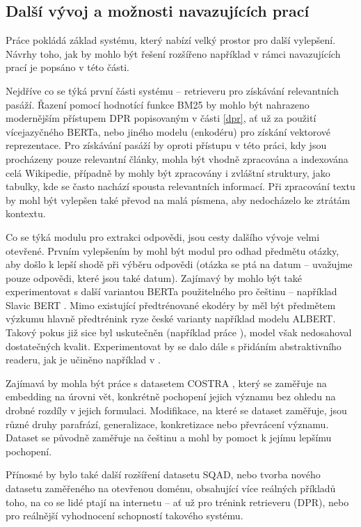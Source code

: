 \subsection{Další vývoj a možnosti navazujících prací}
Práce pokládá základ systému, který nabízí velký prostor pro další vylepšení. Návrhy toho, jak by mohlo být řešení rozšířeno například v rámci navazujících prací je popsáno v této části.\par
Nejdříve co se týká první části systému -- retrieveru pro získávání relevantních pasáží. Řazení pomocí hodnotící funkce BM25 by mohlo být nahrazeno modernějším přístupem DPR popisovaným v části \ref{dpr}, ať už za použití vícejazyčného BERTa, nebo jiného modelu (enkodéru) pro získání vektorové reprezentace. Pro získávání pasáží by oproti přístupu v této práci, kdy jsou procházeny pouze relevantní články, mohla být vhodně zpracována a indexována celá Wikipedie, případně by mohly být zpracovány i zvláštní struktury, jako tabulky, kde se často nachází spousta relevantních informací. Při zpracování textu by mohl být vylepšen také převod na malá písmena, aby nedocházelo ke ztrátám kontextu.\par
Co se týká modulu pro extrakci odpovědi, jsou cesty dalšího vývoje velmi otevřené. Prvním vylepšením by mohl být modul pro odhad předmětu otázky, aby došlo k lepší shodě při výběru odpovědi (otázka se ptá na datum -- uvažujme pouze odpovědi, které jsou také datum). Zajímavý by mohlo být také experimentovat s další variantou BERTa použitelného pro češtinu -- například Slavic BERT \cite{slavicBERT}. Mimo existující předtrénované ekodéry by měl být předmětem výzkumu hlavně předtrénink ryze české varianty například modelu ALBERT. Takový pokus již sice byl uskutečněn (například práce \cite{Zelina2020thesis}), model však nedosahoval dostatečných kvalit. Experimentovat by se dalo dále s přidáním abstraktivního readeru, jak je učiněno například v \cite{fajcik2021pruning}.\par
Zajímavá by mohla být práce s datasetem COSTRA \cite{costra}, který se zaměřuje na embedding na úrovni vět, konkrétně pochopení jejich významu bez ohledu na drobné rozdíly v jejich formulaci. Modifikace, na které se dataset zaměřuje, jsou různé druhy parafrází, generalizace, konkretizace nebo převrácení významu. Dataset se původně zaměřuje na češtinu a mohl by pomoct k jejímu lepšímu pochopení.\par
Přínosné by bylo také další rozšíření datasetu SQAD, nebo tvorba nového datasetu zaměřeného na otevřenou doménu, obsahující více reálných příkladů toho, na co se lidé ptají na internetu -- ať už pro trénink retrieveru (DPR), nebo pro reálnější vyhodnocení schopností takového systému.

